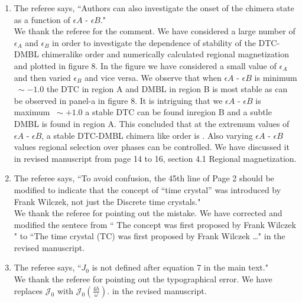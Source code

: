\documentclass[aps,prb,reprint,showpacs,floatfix,superscriptaddress, onecolumn, nofootinbib, 10pt]{revtex4-2}
\newcommand{\response}[1]{{\color{black}#1}} %
\newcommand{\comment}[1]{{\color{blue}#1}} %
\begin{document}
\begin{enumerate}
\begin{enumerate}
		\item The referee says, \comment{``Authors can also investigate the onset of the chimera state as a function of $\epsilon A$ - $\epsilon B$."}\\
		
		\response{We thank the referee for the comment. We have considered a large number of $\epsilon_A$ and $\epsilon_B$ in order to investigate the dependence of stability of the DTC-DMBL chimeralike order and numerically calculated regional magnetization and plotted in figure 8. In the figure we have considered a small value of $\epsilon_A$ and then varied $\epsilon_B$ and vice versa. We observe that when $\epsilon A$ - $\epsilon B$ is minimum $~\sim -1.0$ the DTC in region A and DMBL in region B is most stable as can be observed in panel-a in figure 8. It is intriguing that we   $\epsilon A$ - $\epsilon B$ is maximum $~\sim +1.0$ a stable DTC can be found inregion B and a subtle DMBL is found in region A. This concluded that at the extremum values of  $\epsilon A$ - $\epsilon B$, a stable DTC-DMBL chimera like order is . Also varying $\epsilon A$ - $\epsilon B$ values regional selection over phases can be controlled. We have discussed it in revised manuscript from page 14 to 16, section 4.1 Regional magnetization. }
		
		\item The referee says, \comment{``To avoid confusion, the 45th line of Page 2 should be modified to indicate that the concept of “time crystal” was introduced by Frank Wilczek, not just the Discrete time crystals."}\\
		
		\response{We thank the referee for pointing out the mistake. We have corrected and modified the sentece from `` The concept was
		first proposed by Frank Wilczek " to ``The time crystal (TC) was first proposed by Frank Wilczek \dots" in the revised manuscript.}
	
		\item The referee says, \comment{``$J_0$ is not defined after equation 7 in the main text."}\\
		
		\response{We thank the referee for pointing out the typographical error. We have replaces $\mathcal{J}_0$ with $\mathcal{J}_0\left(\frac{4h}{\omega}\right)$. in the revised manuscript.}
		

\end{enumerate}
\end{enumerate}
\end{document}
